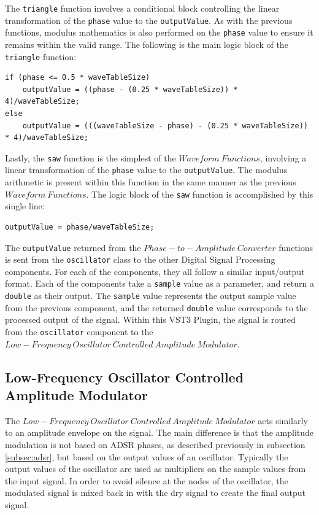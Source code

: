 \documentclass[a4paper,12pt]{report}
\begin{document}
The \texttt{triangle} function involves a conditional block controlling the linear transformation of the \texttt{phase} value to the \texttt{outputValue}.  As with the previous functions, modulus mathematics is also performed on the \texttt{phase} value to ensure it remains within the valid range. The following is the main logic block of the \texttt{triangle} function:
\begin{lstlisting}[caption={triangle()},label={code:triangle},captionpos=b]
if (phase <= 0.5 * waveTableSize)
    outputValue = ((phase - (0.25 * waveTableSize)) * 4)/waveTableSize;
else
    outputValue = (((waveTableSize - phase) - (0.25 * waveTableSize)) * 4)/waveTableSize;
\end{lstlisting}

Lastly, the \texttt{saw} function is the simplest of the $Waveform\ Functions$, involving a linear transformation of the \texttt{phase} value to the \texttt{outputValue}. The modulus arithmetic is present within this function in the same manner as the previous $Waveform\ Functions$. The logic block of the \texttt{saw} function is accomplished by this single line:
\begin{lstlisting}[caption={saw()},label={code:saw},captionpos=b]
outputValue = phase/waveTableSize;
\end{lstlisting}

The \texttt{outputValue} returned from the $Phase-to-Amplitude\ Converter$ functions is sent from the \texttt{oscillator} class to the other Digital Signal Processing components. For each of the components, they all follow a similar input/output format. Each of the components take a \texttt{sample} value as a parameter, and return a \texttt{double} as their output. The \texttt{sample} value represents the output sample value from the previous component, and the returned \texttt{double} value corresponds to the processed output of the signal. Within this VST3 Plugin, the signal is routed from the \texttt{oscillator} component to the $Low-Frequency\ Oscillator\ Controlled\ Amplitude\ Modulator$.

\subsection{Low-Frequency Oscillator Controlled Amplitude Modulator}
\label{subsec:lfcocontrolampmod}
The $Low-Frequency\ Oscillator\ Controlled\ Amplitude\ Modulator$ acts similarly to an amplitude envelope on the signal. The main difference is that the amplitude modulation is not based on ADSR phases, as described previously in subsection \ref{subsec:adsr}, but based on the output values of an oscillator. Typically the output values of the oscillator are used as multipliers on the sample values from the input signal. In order to avoid silence at the nodes of the oscillator, the modulated signal is mixed back in with the dry signal to create the final output signal.
\end{document}
